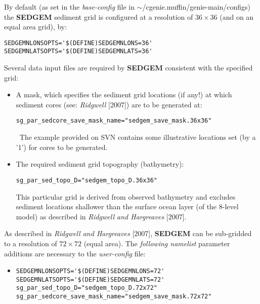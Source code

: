 By default (as set in the \textit{base-config} file in \textsf{\footnotesize \(\sim\)/cgenie.muffin/genie-main/configs}) the \textbf{SEDGEM} sediment grid is configured at a resolution of \(36\times 36\) (and on an equal area grid), by:
\small\vspace{-1mm}\begin{verbatim}
SEDGEMNLONSOPTS='$(DEFINE)SEDGEMNLONS=36'
SEDGEMNLATSOPTS='$(DEFINE)SEDGEMNLATS=36'
\end{verbatim}\vspace{-1mm}\normalsize
Several data input files are required by \textbf{SEDGEM} consistent with the specified grid:

\begin{itemize}

\vspace{1mm}
        \item A mask, which specifies the sediment grid locations (if any!) at which sediment cores (see: \textit{Ridgwell} [2007]) are to be generated at:
\vspace{-1mm}\begin{verbatim}sg_par_sedcore_save_mask_name="sedgem_save_mask.36x36"\end{verbatim}\vspace{-1mm}\
The example provided on SVN contains some illustrative locations set (by a '\textsf{\footnotesize 1}') for cores to be generated.

\vspace{1mm}
\item The required sediment grid topography (bathymetry):
\vspace{-1mm}\begin{verbatim}sg_par_sed_topo_D="sedgem_topo_D.36x36"\end{verbatim}\vspace{-1mm}
        This particular grid is derived from observed bathymetry and excludes sediment locations shallower than the surface ocean layer (of the 8-level model) as described in \textit{Ridgwell and Hargreaves} [2007].

\end{itemize}

\vspace{2mm}
\noindent As described in \textit{Ridgwell and Hargreaves} [2007], \textbf{SEDGEM} can be sub-gridded to a resolution of \(72\times 72\) (equal area). The \textit{following namelist} parameter additions are necessary to the \textit{user-config} file:
\begin{itemize}
\vspace{1mm}
\item 
\small\vspace{-1mm}\begin{verbatim}
SEDGEMNLONSOPTS='$(DEFINE)SEDGEMNLONS=72'
SEDGEMNLATSOPTS='$(DEFINE)SEDGEMNLATS=72'
sg_par_sed_topo_D="sedgem_topo_D.72x72"
sg_par_sedcore_save_mask_name="sedgem_save_mask.72x72"
\end{verbatim}\vspace{-1mm}\normalsize
\end{itemize}

